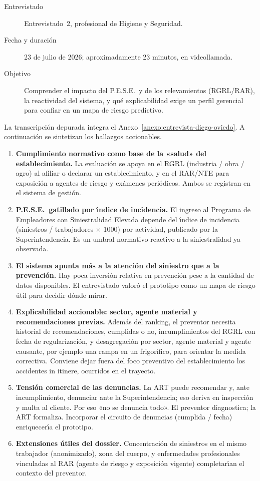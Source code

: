 \begin{description}
	\item[Entrevistado] Entrevistado~2, profesional de Higiene y Seguridad.
	\item[Fecha y duraci\'on] 23 de julio de 2026; aproximadamente 23 minutos, en videollamada.
	\item[Objetivo] Comprender el impacto del P.E.S.E.\ y de los relevamientos (RGRL/RAR), la reactividad del sistema, y qu\'e explicabilidad exige un perfil gerencial para confiar en un mapa de riesgo predictivo.
\end{description}

La transcripci\'on depurada integra el Anexo~\ref{anexo:entrevista-diego-oviedo}. A continuaci\'on se sintetizan los hallazgos accionables.

\begin{enumerate}
	\item \textbf{Cumplimiento normativo como base de la «salud» del establecimiento.}
	La evaluaci\'on se apoya en el RGRL (industria / obra / agro) al afiliar o declarar un establecimiento, y en el RAR/NTE para exposici\'on a agentes de riesgo y ex\'amenes peri\'odicos. Ambos se registran en el sistema de gesti\'on.
	\item \textbf{P.E.S.E.\ gatillado por \'{\i}ndice de incidencia.}
	El ingreso al Programa de Empleadores con Siniestralidad Elevada depende del \'{\i}ndice de incidencia (siniestros / trabajadores $\times$ 1000) por actividad, publicado por la Superintendencia. Es un umbral normativo reactivo a la siniestralidad ya observada.
	\item \textbf{El sistema apunta m\'as a la atenci\'on del siniestro que a la prevenci\'on.}
	Hay poca inversi\'on relativa en prevenci\'on pese a la cantidad de datos disponibles. El entrevistado valor\'o el prototipo como un mapa de riesgo \'util para decidir d\'onde mirar.
	\item \textbf{Explicabilidad accionable: sector, agente material y recomendaciones previas.}
	Adem\'as del ranking, el preventor necesita historial de recomendaciones, cumplidas o no, incumplimientos del RGRL con fecha de regularizaci\'on, y desagregaci\'on por sector, agente material y agente causante, por ejemplo una rampa en un frigor\'{\i}fico, para orientar la medida correctiva. Conviene dejar fuera del foco preventivo del establecimiento los accidentes in itinere, ocurridos en el trayecto.
	\item \textbf{Tensi\'on comercial de las denuncias.}
	La ART puede recomendar y, ante incumplimiento, denunciar ante la Superintendencia; eso deriva en inspecci\'on y multa al cliente. Por eso «no se denuncia todo». El preventor diagnostica; la ART formaliza. Incorporar el circuito de denuncias (cumplida / fecha) enriquecer\'{\i}a el prototipo.
	\item \textbf{Extensiones \'utiles del dossier.}
	Concentraci\'on de siniestros en el mismo trabajador (anonimizado), zona del cuerpo, y enfermedades profesionales vinculadas al RAR (agente de riesgo y exposici\'on vigente) completar\'{\i}an el contexto del preventor.
\end{enumerate}

